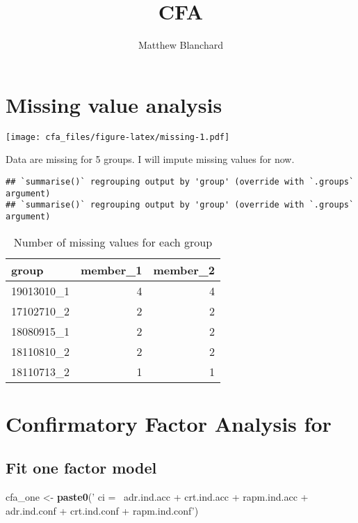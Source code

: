 \documentclass[
]{article}
\title{CFA}
\author{Matthew Blanchard}
\date{}
\newenvironment{Shaded}{\begin{snugshade}}{\end{snugshade}}
\newcommand{\KeywordTok}[1]{\textcolor[rgb]{0.13,0.29,0.53}{\textbf{#1}}}
\newcommand{\NormalTok}[1]{#1}
\newcommand{\StringTok}[1]{\textcolor[rgb]{0.31,0.60,0.02}{#1}}
\begin{document}
\maketitle

\hypertarget{missing-value-analysis}{%
\section{Missing value analysis}\label{missing-value-analysis}}

\texttt{[image: cfa\_files/figure-latex/missing-1.pdf]}

Data are missing for 5 groups. I will impute missing values for now.

\begin{verbatim}
## `summarise()` regrouping output by 'group' (override with `.groups` argument)
## `summarise()` regrouping output by 'group' (override with `.groups` argument)
\end{verbatim}

\begin{table}[H]

\caption{\label{tab:miss}Number of missing values for each group}
\centering
\fontsize{12}{14}\selectfont
\begin{tabular}[t]{lrr}
\toprule
group & member\_1 & member\_2\\
\midrule
19013010\_1 & 4 & 4\\
17102710\_2 & 2 & 2\\
18080915\_1 & 2 & 2\\
18110810\_2 & 2 & 2\\
18110713\_2 & 1 & 1\\
\bottomrule
\end{tabular}
\end{table}

\hypertarget{confirmatory-factor-analysis-for}{%
\section{Confirmatory Factor Analysis
for}\label{confirmatory-factor-analysis-for}}

\hypertarget{fit-one-factor-model}{%
\subsection{Fit one factor model}\label{fit-one-factor-model}}

\begin{Shaded}
\begin{Highlighting}[]
\NormalTok{cfa_one <-}\StringTok{ }\KeywordTok{paste0}\NormalTok{(}\StringTok{'}
\StringTok{                ci  =~ adr.ind.acc + crt.ind.acc + rapm.ind.acc +}
\StringTok{                  adr.ind.conf + crt.ind.conf + rapm.ind.conf'}\NormalTok{)}
\end{Highlighting}
\end{Shaded}
\end{document}
